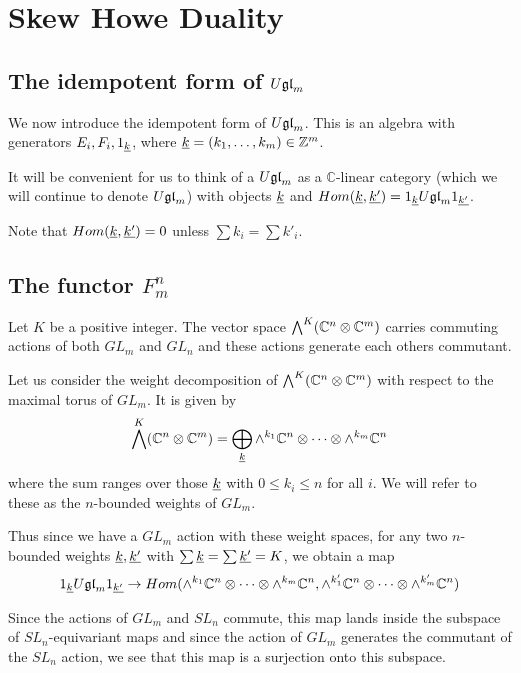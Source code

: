 \documentclass[11pt,leqno]{article}
\begin{document}
\section{Skew Howe Duality}
\label{sec:skew-howe}

\subsection{The idempotent form of $ U\mathfrak{gl}_{m} $}
\label{sec:idemform}
We now introduce the idempotent form of $U\mathfrak{gl}_{m}$.  This is an algebra with generators $ E_i, F_i, 1_{\underline{k}} $, where $ {\underline{k}} = (k_1, \dots, k_m) \in \mathbb Z^m $.

It will be convenient for us to think of a $U\mathfrak{gl}_{m} $ as a $\mathbb C$-linear category (which we will continue to denote $U\mathfrak{gl}_{m}$) with objects $ {\underline{k}} $ and $ Hom({\underline{k}}, {\underline{k'}}) = 1_{\underline{k}} U\mathfrak{gl}_{m} 1_{\underline{k'}}$.

Note that $ Hom({\underline{k}}, {\underline{k'}}) = 0 $ unless $ \sum k_i = \sum k'_i $.


\subsection{The functor $F_m^n$}
Let $K $ be a positive integer.  The vector space $ \bigwedge^K(\mathbb C^n \otimes \mathbb C^m) $ carries commuting actions of both $ GL_m $ and $ GL_n $ and these actions generate each others commutant.  

Let us consider the weight decomposition of $\bigwedge^K(\mathbb C^n \otimes \mathbb C^m)$  with respect to the maximal torus of $ GL_m $.  It is given by 
\begin{equation}
 \bigwedge^K(\mathbb C^n \otimes \mathbb C^m) = \bigoplus_{{\underline{k}}} \wedge^{k_1} \mathbb C^n \otimes \cdots \otimes \wedge^{k_m} \mathbb C^n
 \end{equation}
where the sum ranges over those $ {\underline{k}} $ with $ 0 \le k_i \le n $ for all $ i $.  We will refer to these as the $n$-bounded weights of $ GL_m$.

Thus since we have a $ GL_m$ action with these weight spaces, for any two $n$-bounded weights $ {\underline{k}}, {\underline{k'}}$ with $ \sum {\underline{k}} = \sum {\underline{k'}} = K$, we obtain a map
$$
1_{\underline{k}} U\mathfrak{gl}_{m} 1_{\underline{k'}} \rightarrow Hom(\wedge^{k_1} \mathbb C^n \otimes \cdots \otimes \wedge^{k_m} \mathbb C^n, \wedge^{k'_1} \mathbb C^n \otimes \cdots \otimes \wedge^{k'_m} \mathbb C^n)
$$

Since the actions of $GL_m $ and $ SL_n $ commute, this map lands inside the subspace of $ SL_n$-equivariant maps and since the action of $ GL_m$ generates the commutant of the $ SL_n $ action, we see that this map is a surjection onto this subspace.
\end{document}

